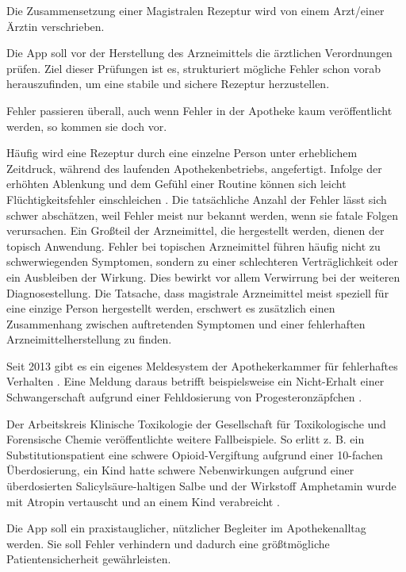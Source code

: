 \documentclass[12pt,a4paper]{article}
\begin{document}
Die Zusammensetzung einer Magistralen Rezeptur wird von einem Arzt/einer Ärztin verschrieben. 

Die App soll vor der Herstellung des Arzneimittels die ärztlichen Verordnungen prüfen. Ziel dieser Prüfungen ist es, strukturiert mögliche Fehler schon vorab herauszufinden, um eine stabile und sichere Rezeptur herzustellen. 

Fehler passieren überall, auch wenn Fehler in der Apotheke kaum veröffentlicht werden, so kommen sie doch vor. 

Häufig wird eine Rezeptur durch eine einzelne Person unter erheblichem Zeitdruck, während des laufenden Apothekenbetriebs, angefertigt. Infolge der erhöhten Ablenkung und dem Gefühl einer Routine können sich leicht Flüchtigkeitsfehler einschleichen \cite{DAZ.online.2015}.
Die tatsächliche Anzahl der Fehler lässt sich schwer abschätzen, weil Fehler meist nur bekannt werden, wenn sie fatale Folgen verursachen. Ein Großteil der Arzneimittel, die hergestellt werden, dienen der topisch Anwendung. Fehler bei topischen Arzneimittel führen häufig nicht zu schwerwiegenden Symptomen, sondern zu einer schlechteren Verträglichkeit oder ein Ausbleiben der Wirkung. Dies bewirkt vor allem Verwirrung bei der weiteren Diagnosestellung. Die Tatsache, dass magistrale Arzneimittel meist speziell für eine einzige Person hergestellt werden, erschwert es zusätzlich einen Zusammenhang zwischen auftretenden Symptomen und einer fehlerhaften Arzneimittelherstellung zu finden. 


Seit 2013 gibt es ein eigenes Meldesystem der Apothekerkammer für fehlerhaftes Verhalten \cite{.25.03.2022b}. %
Eine Meldung daraus betrifft beispielsweise ein Nicht-Erhalt einer Schwangerschaft aufgrund einer Fehldosierung von Progesteronzäpfchen \cite{Holzer.2019}.

Der Arbeitskreis Klinische Toxikologie der Gesellschaft für Toxikologische und Forensische
Chemie veröffentlichte weitere Fallbeispiele. So erlitt z. B.  ein Substitutionspatient eine schwere Opioid-Vergiftung aufgrund einer 10-fachen Überdosierung, ein Kind hatte schwere Nebenwirkungen aufgrund einer überdosierten Salicylsäure-haltigen Salbe und der Wirkstoff Amphetamin wurde mit Atropin vertauscht und an einem Kind verabreicht \cite{DAZ.online.2015}. %



Die App soll ein praxistauglicher, nützlicher Begleiter im Apothekenalltag werden.
Sie soll Fehler verhindern und dadurch eine größtmögliche Patientensicherheit gewährleisten. 
\end{document}
